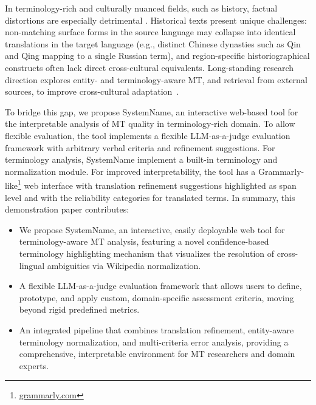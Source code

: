 \documentclass[11pt]{article}
\newcommand{\systemname}{SystemName}
\begin{document}
In terminology-rich and culturally nuanced fields, such as history, factual distortions are especially detrimental \citep{conia2024enhancing, zhao2020knowledge}.
Historical texts present unique challenges: non-matching surface forms in the source language may collapse into identical translations in the target language (e.g., distinct Chinese dynasties such as Qin and Qing mapping to a single Russian term), and region-specific historiographical constructs often lack direct cross-cultural equivalents. Long-standing research direction explores entity- and terminology-aware MT, and retrieval from external sources, to improve cross-cultural adaptation~\cite{zhao-etal-2020-knowledge,DBLP:conf/ijcai/ZhaoZZZ20,DBLP:conf/aaai/ConiaLLM024}. 




To bridge this gap, we propose \systemname, an interactive web-based tool for the interpretable analysis of MT quality in terminology-rich domain. To allow flexible evaluation, the tool implements a flexible LLM-as-a-judge evaluation framework with arbitrary verbal criteria and refinement suggestions. For terminology analysis, \systemname{} implement a built-in terminology and normalization module. For improved interpretability, the tool has a Grammarly-like\footnote{\href{https://grammarly.com}{grammarly.com}} web interface with translation refinement suggestions highlighted as span level and with the reliability categories for translated terms.
In summary, this demonstration paper contributes:
\begin{itemize}
    \item We propose \systemname{}, an interactive, easily deployable web tool for terminology-aware MT analysis, featuring a novel confidence-based terminology highlighting mechanism that visualizes the resolution of cross-lingual ambiguities via Wikipedia normalization.
    \item A flexible LLM-as-a-judge evaluation framework that allows users to define, prototype, and apply custom, domain-specific assessment criteria, moving beyond rigid predefined metrics.
    \item An integrated pipeline that combines translation refinement, entity-aware terminology normalization, and multi-criteria error analysis, providing a comprehensive, interpretable environment for MT researchers and domain experts.
\end{itemize}
\end{document}
